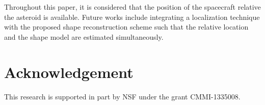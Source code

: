 \documentclass[journal]{new-aiaa}
\begin{document}
Throughout this paper, it is considered that the position of the spacecraft relative the asteroid is available. 
Future works include integrating a localization technique with the proposed shape reconstruction scheme such that the relative location and the shape model are estimated simultaneously.






\section{Acknowledgement}
This research is supported in part by NSF under the grant CMMI-1335008.


\end{document}
